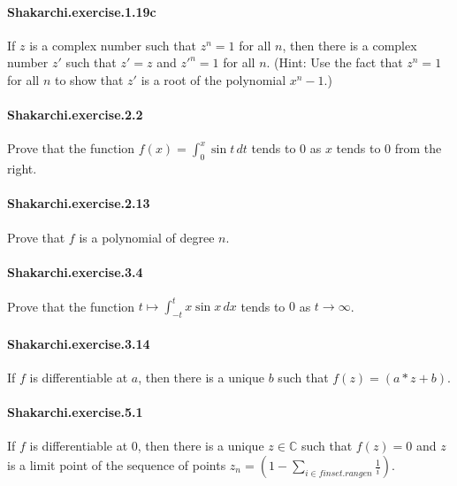 \documentclass{article}
\begin{document}
\paragraph{Shakarchi.exercise.1.19c} If $z$ is a complex number such that $z^n = 1$ for all $n$, then there is a complex number $z'$ such that $z' = z$ and $z'^n = 1$ for all $n$. (Hint: Use the fact that $z^n = 1$ for all $n$ to show that $z'$ is a root of the polynomial $x^n - 1$.)

\paragraph{Shakarchi.exercise.2.2} Prove that the function $f(x) = \int_0^x \sin t \, dt$ tends to $0$ as $x$ tends to $0$ from the right.

\paragraph{Shakarchi.exercise.2.13} Prove that $f$ is a polynomial of degree $n$.

\paragraph{Shakarchi.exercise.3.4} Prove that the function $t \mapsto \int_{-t}^t x \sin x \, dx$ tends to $0$ as $t \to \infty$.

\paragraph{Shakarchi.exercise.3.14} If $f$ is differentiable at $a$, then there is a unique $b$ such that $f(z) = (a * z + b)$.

\paragraph{Shakarchi.exercise.5.1} If $f$ is differentiable at $0$, then there is a unique $z \in \mathbb{C}$ such that $f(z) = 0$ and $z$ is a limit point of the sequence of points $z_n = (1 - \sum_{i \in finset.range n} \frac{1}{i})$.
\end{document}
